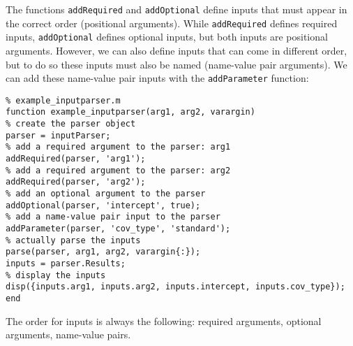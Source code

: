 \documentclass[12pt, a4paper]{article}
\begin{document}
The functions \texttt{addRequired} and \texttt{addOptional} define inputs that must appear in the correct order (positional arguments). While \texttt{addRequired} defines required inputs, \texttt{addOptional} defines optional inputs, but both inputs are positional arguments.
However, we can also define inputs that can come in different order, but to do so these inputs must also be named (name-value pair arguments).
We can add these name-value pair inputs with the \texttt{addParameter} function:
\lstset{language=matlab,label= ,caption= ,captionpos=b,firstnumber=1,numbers=left,style=Matlab-editor}
\begin{lstlisting}
% example_inputparser.m
function example_inputparser(arg1, arg2, varargin)
% create the parser object
parser = inputParser;
% add a required argument to the parser: arg1
addRequired(parser, 'arg1');
% add a required argument to the parser: arg2
addRequired(parser, 'arg2');
% add an optional argument to the parser
addOptional(parser, 'intercept', true);
% add a name-value pair input to the parser
addParameter(parser, 'cov_type', 'standard');
% actually parse the inputs
parse(parser, arg1, arg2, varargin{:});
inputs = parser.Results;
% display the inputs
disp({inputs.arg1, inputs.arg2, inputs.intercept, inputs.cov_type});
end
\end{lstlisting}
The order for inputs is always the following: required arguments, optional arguments, name-value pairs.
\end{document}
